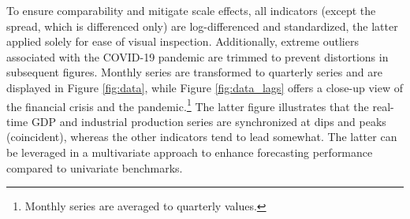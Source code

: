\documentclass[11pt,a4paper]{article}
\begin{document}
To ensure comparability and mitigate scale effects, all indicators (except the spread, which is differenced only) are log-differenced and standardized, the latter applied solely for ease of visual inspection. Additionally, extreme outliers associated with the COVID-19 pandemic are trimmed to prevent distortions in subsequent figures. 
 Monthly series are transformed to quarterly series and are displayed in Figure \ref{fig:data}, while Figure \ref{fig:data_lags} offers a close-up view of the financial crisis and the pandemic.\footnote{Monthly series are averaged to quarterly values.} The latter figure illustrates that the real-time GDP and industrial production series are synchronized at dips and peaks (coincident), whereas the other indicators tend to lead somewhat. The latter can be leveraged in a multivariate approach to enhance forecasting performance compared to univariate benchmarks. 
\end{document}
